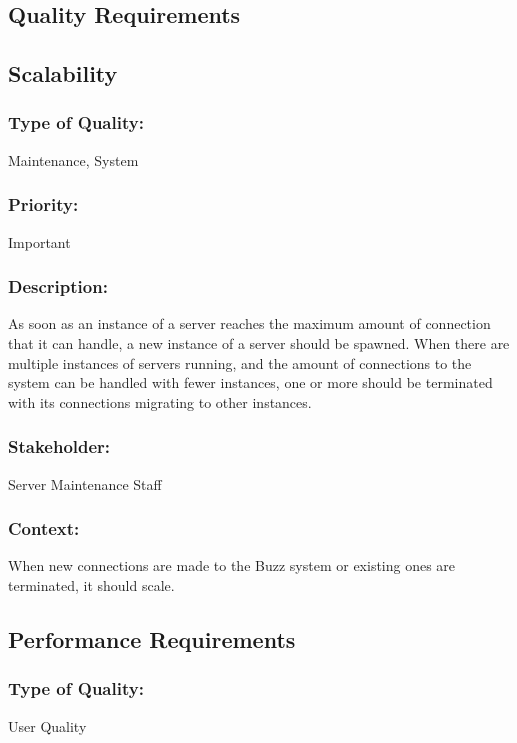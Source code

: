 \documentclass[11pt]{article}
\begin{document}
	\newpage
	\begin{center}
	\section{\textbf{\huge{Quality Requirements}}}
	\end{center}
	\subsection{Scalability}
		\subsubsection{Type of Quality:}
			\textbf{}Maintenance, System
		
		\subsubsection{Priority:}
			\textbf{}Important 
		
		\subsubsection{Description:}
			\textbf{}As soon as an instance of a server reaches the maximum amount of connection that it can handle, a new instance of a server should be spawned. When there are multiple instances of servers running, and the amount of connections to the system can be handled with fewer instances, one or more should be terminated with its connections migrating to other instances.
		
		\subsubsection{Stakeholder:}
			\textbf{}Server Maintenance Staff

		\subsubsection{Context:}
			\textbf{}When new connections are made to the Buzz system or existing ones are terminated, it should scale.
		
	\subsection{Performance Requirements}
		\subsubsection{Type of Quality:}
			\textbf{}User Quality
		
\end{document}
